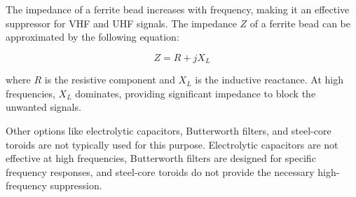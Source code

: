 The impedance of a ferrite bead increases with frequency, making it an effective suppressor for VHF and UHF signals. The impedance \( Z \) of a ferrite bead can be approximated by the following equation:

\[
Z = R + jX_L
\]

where \( R \) is the resistive component and \( X_L \) is the inductive reactance. At high frequencies, \( X_L \) dominates, providing significant impedance to block the unwanted signals.

Other options like electrolytic capacitors, Butterworth filters, and steel-core toroids are not typically used for this purpose. Electrolytic capacitors are not effective at high frequencies, Butterworth filters are designed for specific frequency responses, and steel-core toroids do not provide the necessary high-frequency suppression.

